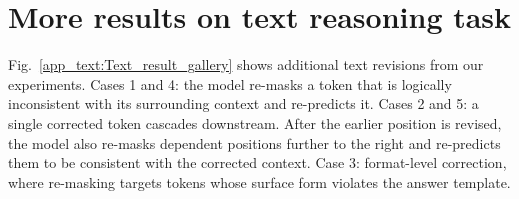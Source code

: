 \section{More results on text reasoning task}
\label{app:Text-Cases}


Fig.~\ref{app_text:Text_result_gallery} shows additional text revisions from our experiments. Cases 1 and 4: the model re-masks a token that is logically inconsistent with its surrounding context and re-predicts it. Cases 2 and 5: a single corrected token cascades downstream. After the earlier position is revised, the model also re-masks dependent positions further to the right and re-predicts them to be consistent with the corrected context. Case 3: format-level correction, where re-masking targets tokens whose surface form violates the answer template.
